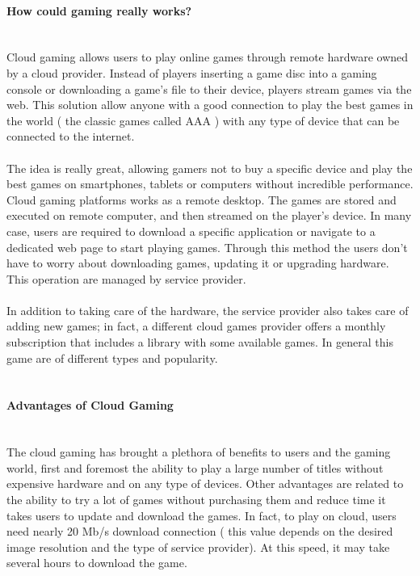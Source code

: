 \documentclass[a4paper,12pt]{report}
\begin{document}
\paragraph{How could gaming really works?\\\\}
Cloud gaming allows users to play online games through remote hardware owned by a cloud provider. Instead of players inserting a game disc into a gaming console or downloading a game’s file to their device, players stream games via the web. This solution allow anyone with a good connection to play the best games in the world ( the classic games called AAA ) with any type of device that can be connected to the internet.\\\\
The idea is really great, allowing gamers not to buy a specific device and play the best games on smartphones, tablets or computers without incredible performance. \\
%
Cloud gaming platforms works as a remote desktop. The games are stored and executed on remote computer, and then streamed on the player's device. In many case, users are required to download a specific application or navigate to a dedicated web page to start playing games. Through this method the users don't have to worry about downloading games, updating it or upgrading hardware. This operation are managed by service provider.\\\\
%
In addition to taking care of the hardware, the service provider also takes care of adding new games; in fact, a different cloud games provider offers a monthly subscription that includes a library with some available games. In general this game are of different types and popularity. \\\\
%
\paragraph{Advantages of Cloud Gaming\\\\}

The cloud gaming has brought a plethora of benefits to users and the gaming world, first and foremost the ability to play a large number of titles without  expensive hardware and on any type of devices. Other advantages are related to the ability to try a lot of games without purchasing them and reduce time it takes users to update and download the games. In fact, to play on cloud, users need nearly 20 Mb/s download connection ( this value depends on the desired image resolution and the type of service provider). At this speed, it may take several hours to download the game. 
%
\end{document}
